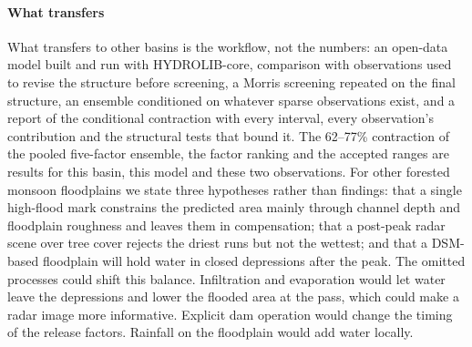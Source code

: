 \documentclass[preprint,12pt,authoryear]{elsarticle}
\begin{document}
\paragraph{What transfers}
What transfers to other basins is the workflow, not the numbers: an open-data model built and run with HYDROLIB-core, comparison with observations used to revise the structure before screening, a Morris screening repeated on the final structure, an ensemble conditioned on whatever sparse observations exist, and a report of the conditional contraction with every interval, every observation's contribution and the structural tests that bound it. The 62--77\% contraction of the pooled five-factor ensemble, the factor ranking and the accepted ranges are results for this basin, this model and these two observations. For other forested monsoon floodplains we state three hypotheses rather than findings: that a single high-flood mark constrains the predicted area mainly through channel depth and floodplain roughness and leaves them in compensation; that a post-peak radar scene over tree cover rejects the driest runs but not the wettest; and that a DSM-based floodplain will hold water in closed depressions after the peak. The omitted processes could shift this balance. Infiltration and evaporation would let water leave the depressions and lower the flooded area at the pass, which could make a radar image more informative. Explicit dam operation would change the timing of the release factors. Rainfall on the floodplain would add water locally.
\end{document}
